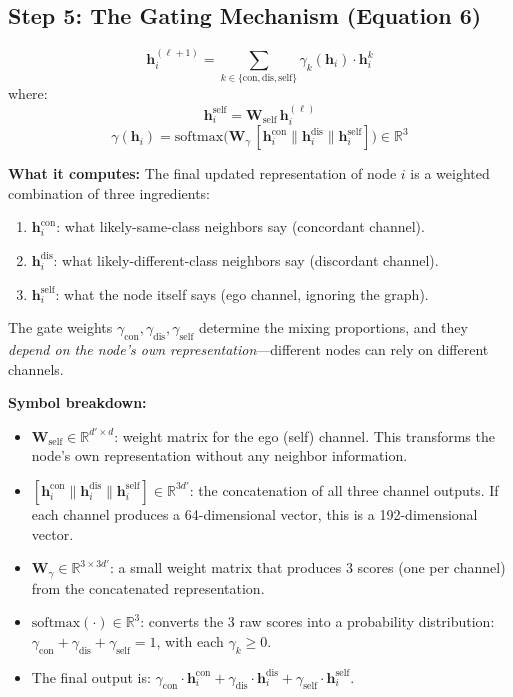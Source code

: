 \documentclass[11pt,a4paper]{article}
\newcommand{\R}{\mathbb{R}}
\newcommand{\bW}{\mathbf{W}}
\newcommand{\bh}{\mathbf{h}}
\theoremstyle{definition}
\theoremstyle{plain}
\begin{document}
\subsection{Step 5: The Gating Mechanism (Equation 6)}
\label{sec:gating}

\begin{equation}
  \bh_i^{(\ell+1)} = \sum_{k \in \{\text{con}, \text{dis}, \text{self}\}}
  \gamma_k(\bh_i) \cdot \bh_i^{k}
  \tag{Eq.~6}
\end{equation}
where:
\[
  \bh_i^{\text{self}} = \bW_{\text{self}}\, \bh_i^{(\ell)}
\]
\[
  \gamma(\bh_i) = \mathrm{softmax}\bigl(\bW_\gamma\, [\bh_i^{\text{con}} \| \bh_i^{\text{dis}} \| \bh_i^{\text{self}}]\bigr) \in \R^3
\]

\textbf{What it computes:}
The final updated representation of node $i$ is a weighted combination of three
ingredients:
\begin{enumerate}[nosep]
  \item $\bh_i^{\text{con}}$: what likely-same-class neighbors say (concordant channel).
  \item $\bh_i^{\text{dis}}$: what likely-different-class neighbors say (discordant channel).
  \item $\bh_i^{\text{self}}$: what the node itself says (ego channel, ignoring
    the graph).
\end{enumerate}
The gate weights $\gamma_{\text{con}}, \gamma_{\text{dis}}, \gamma_{\text{self}}$
determine the mixing proportions, and they \emph{depend on the node's own
representation}---different nodes can rely on different channels.

\textbf{Symbol breakdown:}
\begin{itemize}
  \item $\bW_{\text{self}} \in \R^{d' \times d}$: weight matrix for the ego
    (self) channel. This transforms the node's own representation without
    any neighbor information.
  \item $[\bh_i^{\text{con}} \| \bh_i^{\text{dis}} \| \bh_i^{\text{self}}] \in \R^{3d'}$:
    the concatenation of all three channel outputs.
    If each channel produces a 64-dimensional vector, this is a 192-dimensional
    vector.
  \item $\bW_\gamma \in \R^{3 \times 3d'}$: a small weight matrix that produces
    3 scores (one per channel) from the concatenated representation.
  \item $\mathrm{softmax}(\cdot) \in \R^3$: converts the 3 raw scores into a
    probability distribution: $\gamma_{\text{con}} + \gamma_{\text{dis}} +
    \gamma_{\text{self}} = 1$, with each $\gamma_k \geq 0$.
  \item The final output is: $\gamma_{\text{con}} \cdot \bh_i^{\text{con}} +
    \gamma_{\text{dis}} \cdot \bh_i^{\text{dis}} +
    \gamma_{\text{self}} \cdot \bh_i^{\text{self}}$.
\end{itemize}
\end{document}
